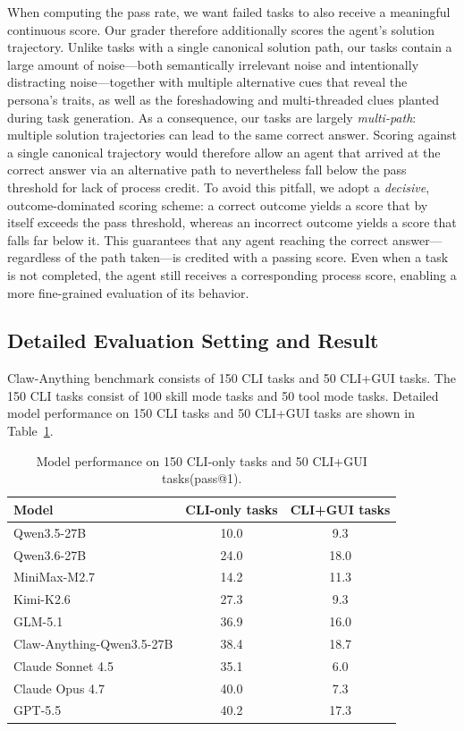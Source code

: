 \documentclass{article}
\begin{document}
When computing the pass rate, we want failed tasks to also receive a meaningful continuous score. Our grader therefore additionally scores the agent's solution trajectory. Unlike tasks with a single canonical solution path, our tasks contain a large amount of noise---both semantically irrelevant noise and intentionally distracting noise---together with multiple alternative cues that reveal the persona's traits, as well as the foreshadowing and multi-threaded clues planted during task generation. As a consequence, our tasks are largely \emph{multi-path}: multiple solution trajectories can lead to the same correct answer. Scoring against a single canonical trajectory would therefore allow an agent that arrived at the correct answer via an alternative path to nevertheless fall below the pass threshold for lack of process credit. To avoid this pitfall, we adopt a \emph{decisive}, outcome-dominated scoring scheme: a correct outcome yields a score that by itself exceeds the pass threshold, whereas an incorrect outcome yields a score that falls far below it. This guarantees that any agent reaching the correct answer---regardless of the path taken---is credited with a passing score. Even when a task is not completed, the agent still receives a corresponding process score, enabling a more fine-grained evaluation of its behavior.


\subsection{Detailed Evaluation Setting and Result}

Claw-Anything benchmark consists of 150 CLI tasks and 50 CLI+GUI tasks. The 150 CLI tasks consist of 100 skill mode tasks and 50 tool mode tasks.
Detailed model performance on 150 CLI tasks and 50 CLI+GUI tasks are shown in Table~\ref{tab:guiper}.

\begin{table}[t]
    \centering
    \caption{Model performance on 150 CLI-only tasks and 50 CLI+GUI tasks(pass@1).}
    \label{tab:guiper}
    \begin{tabularx}{0.65\columnwidth}{lcc}
    \toprule
    Model & CLI-only tasks & CLI+GUI tasks \\
    \midrule
    Qwen3.5-27B             & 10.0 & 9.3 \\
    Qwen3.6-27B             & 24.0 & 18.0 \\
    MiniMax-M2.7            & 14.2 & 11.3 \\
    Kimi-K2.6               & 27.3 & 9.3 \\
    GLM-5.1                 & 36.9 & 16.0 \\
    Claw-Anything-Qwen3.5-27B & 38.4 & 18.7 \\
    Claude Sonnet 4.5       & 35.1 & 6.0 \\
    Claude Opus 4.7         & 40.0 & 7.3 \\
    GPT-5.5                 & 40.2 & 17.3 \\
    \bottomrule
    \end{tabularx}
\end{table}
\end{document}
